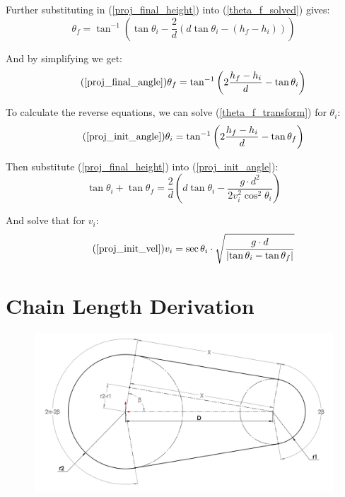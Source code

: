 \documentclass[11pt,a4paper,titlepage]{article}
\begin{document}
	Further substituting in (\ref{proj_final_height}) into (\ref{theta_f_solved}) gives:
	\begin{equation} \label{theta_f_transform}
		\theta_f = \tan^{-1} \left( \tan \theta_i - \frac{2}{d} (d \tan \theta_i - (h_f - h_i)) \right)
	\end{equation}
	
	And by simplifying we get:
	\begin{equation} \tag{\ref*{proj_final_angle}}
		\theta_f = \tan^{-1} \left( 2 \frac{h_f - h_i}{d} - \tan \theta_i \right)
	\end{equation}
	
	To calculate the reverse equations, we can solve (\ref{theta_f_transform}) for $\theta_i$:
	\begin{equation} \tag{\ref*{proj_init_angle}}
		\theta_i = \tan^{-1} \left( 2 \frac{h_f - h_i}{d} - \tan \theta_f \right)
	\end{equation}
	
	Then substitute (\ref{proj_final_height}) into (\ref{proj_init_angle}):
	\begin{equation}
		\tan \theta_i + \tan \theta_f = \frac{2}{d} \left( d \tan \theta_i - \frac{g \cdot d^2}{2 v_i^2 \cos^2 \theta_i} \right)
	\end{equation}
	
	And solve that for $v_i$:
	\begin{equation} \tag{\ref*{proj_init_vel}}
		v_i = \sec \theta_i \cdot \sqrt{\frac{g \cdot d}{\left| \tan \theta_i - \tan \theta_f \right|}}
	\end{equation}
	
	\section{Chain Length Derivation} \label{chain_appendix}

	\begin{figure}[H]
		\centering
		\includegraphics[width=\linewidth]{Chain_Derivation}
	\end{figure}
	
\end{document}

